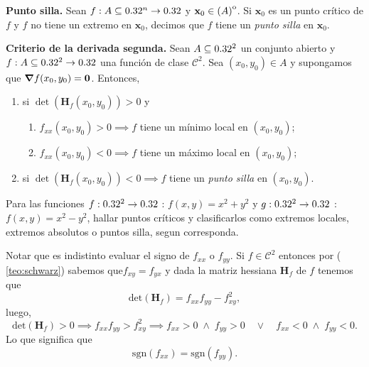 \begin{definition} \textbf{Punto silla.} \label{def:pto_silla}
 Sean $f: A  \subseteq  0.32^n \to 0.32$ y $\mathbf{x}_0 \in {\kern0pt(A)}^{\mathrm{o}}$. Si $\mathbf{x}_0$ es un punto cr\'itico de $f$ y $f$ no tiene un extremo en $\mathbf{x}_0$, decimos que $f$ tiene un \emph{punto silla} en $\mathbf{x}_0$.
\end{definition}

\begin{theorem}\textbf{Criterio de la derivada segunda.} \label{teo:derivada_2da}
  Sean $A  \subseteq  0.32^2$ un conjunto abierto y $f: A  \subseteq  0.32^2 \to 0.32$ una funci\'on de clase $\mathcal{C}^2$. Sea $(x_0,y_0) \in A$ y supongamos que $\grad f(x_0,y_0) = \mathbf{0}$. Entonces,  
   \begin{enumerate} %
      \item si $\det(\boldsymbol{H}_f (x_0,y_0)) > 0$ y
      \begin{enumerate} %
          \item $f_{xx} (x_0,y_0) > 0\implies f$ tiene un m\'inimo local en $(x_0,y_0)$;
          \item $f_{xx} (x_0,y_0) < 0\implies f$ tiene un m\'aximo local en $(x_0,y_0)$;
      \end{enumerate}
      \item si $\det(\boldsymbol{H}_f (x_0,y_0)) < 0 \implies f$ tiene un \emph{punto silla} en $(x_0,y_0)$.
   \end{enumerate}  
\end{theorem}

\begin{tarea}  Para las funciones  $f:0.32^{2}\rightarrow0.32$ : $\displaystyle f(x,y)= x^{2} + y^{2}$  y $g:0.32^{2}\rightarrow0.32$ : $\displaystyle f(x,y)= x^{2} - y^{2}$,  hallar  puntos cr\'iticos y clasificarlos como extremos locales,  extremos absolutos o puntos silla,  segun corresponda.
\end{tarea}

\begin{obs}
  Notar que es indistinto evaluar el signo de $f_{xx}$ o $f_{yy}$. Si $f\in\mathcal{C}^2$  entonces  por ( \ref{teo:schwarz}) sabemos que$ f_{xy}=f_{yx}$ y  dada la matriz hessiana $\boldsymbol{H}_f$ de $f$ tenemos que
  \[
    \text{det}(\boldsymbol{H}_f)=f_{xx}f_{yy}-f_{xy}^2,
  \] luego, 
 \[
    \text{det}(\boldsymbol{H}_f)>0\implies f_{xx}f_{yy}>f_{xy}^2\implies f_{xx}>0\;\land\; f_{yy}>0\quad\lor\quad f_{xx}<0\;\land\; f_{yy}<0.
  \]
  Lo que significa que 
  \[
    \text{sgn}(f_{xx})=\text{sgn}(f_{yy}).
  \]
\end{obs}



